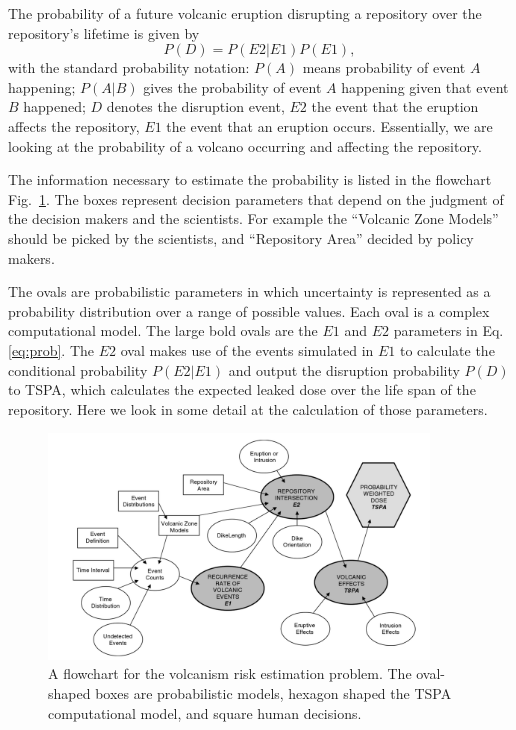 \documentclass[nofootinbib,preprint,aps]{revtex4-1}
\begin{document}
        The probability of a future volcanic eruption disrupting a repository over
        the repository's lifetime is given by
        \begin{equation}
            \label{eq:prob}
            P(D) = P(E2|E1)P(E1),
        \end{equation}
        with the standard probability notation: 
        $P(A)$ means probability of event $A$ happening;
        $P(A|B)$ gives the probability of event $A$ happening given that event $B$ happened;
        $D$ denotes the disruption event,
        $E2$ the event that the eruption affects the repository, $E1$ the event that an eruption occurs.
        Essentially, we are looking at the probability of a volcano occurring and affecting the repository.

        The information necessary to estimate the probability is listed in the flowchart Fig.~\ref{fig:volcanos}.
        The boxes represent decision parameters that depend on the judgment of the decision makers and
        the scientists. For example the ``Volcanic Zone Models'' should be picked by the scientists, and
        ``Repository Area'' decided by policy makers.
        
        The ovals are probabilistic parameters in which uncertainty
        is represented as a probability distribution over a range of possible values.
        Each oval is a complex computational model.
        The large bold ovals are the $E1$ and $E2$ parameters in Eq.\ref{eq:prob}.
        The $E2$ oval makes
        use of the events simulated in $E1$ to calculate the conditional probability $P(E2|E1)$ and output
        the disruption probability $P(D)$ to TSPA, which calculates the expected leaked dose over the
        life span of the repository. Here we look in some detail at the calculation of those parameters.
        \begin{figure}
            \centering
            \includegraphics[width=0.9\textwidth]{volcano.png}
            \caption{A flowchart for the volcanism risk estimation problem. The oval-shaped
            boxes are probabilistic models, hexagon shaped the TSPA computational model, and
        square human decisions.\cite{cv14}}
            \label{fig:volcanos}
        \end{figure}
\end{document}
